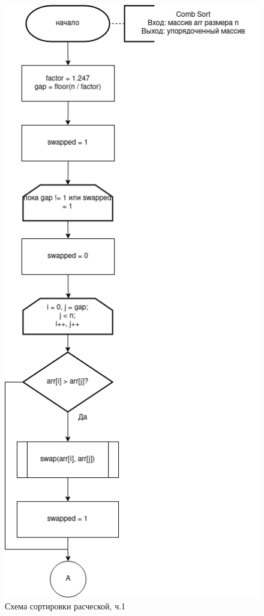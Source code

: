\documentclass[12pt]{report}
\begin{document}
	\begin{figure}[H]
		\centering
		\includegraphics[width=0.5\linewidth]{combSort_1}
		\caption{Схема сортировки расческой, ч.1}
		\label{fig:schema_selection}
	\end{figure}
	
\end{document}
